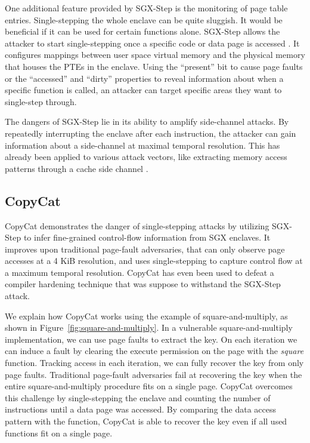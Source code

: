 \documentclass{llncs}
\begin{document}
One additional feature provided by SGX-Step is the monitoring of page table
entries.
Single-stepping the whole enclave can be quite sluggish.
It would be beneficial if it can be used for certain functions alone.
SGX-Step allows the attacker to start single-stepping once a specific code or
data page is accessed \cite{BulckWKPS17}.
It configures mappings between user space virtual memory and the physical
memory that houses the PTEs in the enclave.
Using the ``present'' bit to cause page faults \cite{XuCP15} or the
``accessed'' and ``dirty'' properties to reveal information about when a
specific function is called, an attacker can target specific areas they want to
single-step through.

The dangers of SGX-Step lie in its ability to amplify side-channel attacks.
By repeatedly interrupting the enclave after each instruction, the attacker can
gain information about a side-channel at maximal temporal resolution.
This has already been applied to various attack vectors, like extracting memory
access patterns through a cache side channel \cite{HahnelCP17}.

\subsection{CopyCat}

CopyCat \cite{MoghimiBHPS20} demonstrates the danger of single-stepping attacks
by utilizing SGX-Step to infer fine-grained control-flow information from SGX
enclaves.
It improves upon traditional page-fault adversaries, that can only observe page
accesses at a 4 KiB resolution, and uses single-stepping to capture control
flow at a maximum temporal resolution.
CopyCat has even been used to defeat a compiler hardening technique
\cite{HosseinzadehLLP18} that was suppose to withstand the SGX-Step attack.

We explain how CopyCat works using the example of square-and-multiply,
as shown in Figure~\ref{fig:square-and-multiply}.
In a vulnerable square-and-multiply implementation, we can use page faults to
extract the key.
On each iteration we can induce a fault by clearing the execute permission on
the page with the \emph{square} function.
Tracking access in each iteration, we can fully recover the key from only page
faults.
Traditional page-fault adversaries fail at recovering the key when the entire
square-and-multiply procedure fits on a single page.
CopyCat overcomes this challenge by single-stepping the enclave and counting
the number of instructions until a data page was accessed.
By comparing the data access pattern with the function, CopyCat is able to
recover the key even if all used functions fit on a single page.
\end{document}
